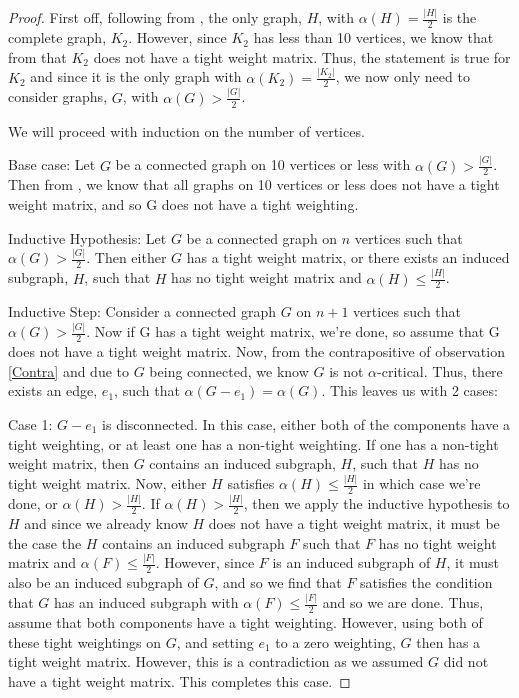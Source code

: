 \documentclass[12pt]{article}
\theoremstyle{parenbold}
\begin{document}
\begin{proof}

First off, following from \cite{plummer1970some}, the only graph, $H$, with $\alpha(H) = \frac{|H|}{2}$ is the complete graph, $K_2$. However, since $K_2$ has less than 10 vertices, we know that from \cite{elzinga2007minimum} that $K_2$ does not have a tight weight matrix. Thus, the statement is true for $K_2$ and since it is the only graph with $\alpha(K_2) = \frac{|K_2|}{2}$, we now only need to consider graphs, $G$, with $\alpha(G) > \frac{|G|}{2}$.

We will proceed with induction on the number of vertices.

Base case: Let $G$ be a connected graph on 10 vertices or less with $\alpha(G) > \frac{|G|}{2}$. Then from \cite{elzinga2007minimum}, we know that all graphs on 10 vertices or less does not have a tight weight matrix, and so G does not have a tight weighting.

Inductive Hypothesis: Let $G$ be a connected graph on $n$ vertices such that $\alpha(G) > \frac{|G|}{2}$. Then either $G$ has a tight weight matrix, or there exists an induced subgraph, $H$, such that $H$ has no tight weight matrix and $\alpha(H) \leq \frac{|H|}{2}$.

Inductive Step: Consider a connected graph $G$ on $n+1$ vertices such that $\alpha(G) > \frac{|G|}{2}$. Now if G has a tight weight matrix, we're done, so assume that G does not have a tight weight matrix. Now, from the contrapositive of observation \ref{Contra} and due to $G$ being connected, we know $G$ is not $\alpha$-critical. Thus, there exists an edge, $e_1$, such that $\alpha(G-e_1) = \alpha(G)$. This leaves us with 2 cases:

Case 1: $G-e_1$ is disconnected. In this case, either both of the components have a tight weighting, or at least one has a non-tight weighting. If one has a non-tight weight matrix, then $G$ contains an induced subgraph, $H$, such that $H$ has no tight weight matrix. Now, either $H$ satisfies $\alpha(H) \leq \frac{|H|}{2}$ in which case we're done, or $\alpha(H) > \frac{|H|}{2}$. If $\alpha(H) > \frac{|H|}{2}$, then we apply the inductive hypothesis to $H$ and since we already know $H$ does not have a tight weight matrix, it must be the case the $H$ contains an induced subgraph $F$ such that $F$ has no tight weight matrix and $\alpha(F) \leq \frac{|F|}{2}$. However, since $F$ is an induced subgraph of $H$, it must also be an induced subgraph of $G$, and so we find that $F$ satisfies the condition that $G$ has an induced subgraph with $\alpha(F) \leq \frac{|F|}{2}$ and so we are done. Thus, assume that both components have a tight weighting. However, using both of these tight weightings on $G$, and setting $e_1$ to a zero weighting, $G$ then has a tight weight matrix. However, this is a contradiction as we assumed $G$ did not have a tight weight matrix. This completes this case.


\end{proof}
\end{document}
